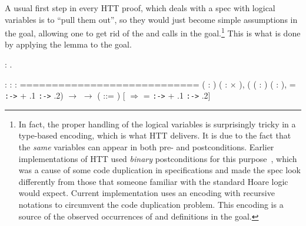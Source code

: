 \coqdocemptyline
A usual first step in every HTT proof, which deals with a spec with
logical variables is to ``pull them out'', so they would just become
simple assumptions in the goal, allowing one to get rid of the
 and  calls in the goal.\footnote{In fact, the
proper handling of the logical variables is surprisingly tricky in a
type-based encoding, which is what HTT delivers. It is due to the fact
that the \emph{same} variables can appear in both pre- and
postconditions. Earlier implementations of HTT used \emph{binary}
postconditions for this
purpose~\cite{Nanevski-al:JFP08,Nanevski-al:POPL10}, which was a cause
of some code duplication in specifications and made the spec look
differently from those that someone familiar with the standard Hoare
logic would expect. Current implementation uses an encoding with
recursive notations to circumvent the code duplication problem. This
encoding is a source of the observed occurrences of  and
 definitions in the goal.} This is what is done by
applying the lemma   to the goal.
\begin{coqdoccode}
\coqdocemptyline
\coqdocnoindent
{}: .\coqdoceol
\coqdocemptyline
\end{coqdoccode}
\coqdoceol
\coqdocemptyline
\coqdocindent{1.00em}
 : \coqdoceol
\coqdocindent{1.00em}
 : \coqdoceol
\coqdocindent{1.00em}
 : \coqdoceol
\coqdocindent{1.00em}
============================\coqdoceol
\coqdocindent{1.50em}
\coqdockw{\ensuremath{\forall}} ( : ) ( :  \ensuremath{\times} ),\coqdoceol
\coqdocindent{1.50em}
( ( : ) ( : ),  =  \texttt{:->}  + .1 \texttt{:->} .2) \ensuremath{\rightarrow}\coqdoceol
\coqdocindent{1.50em}
  \ensuremath{\rightarrow}   ( ::= ) [ \coqdocvar{\_}  \ensuremath{\Rightarrow}  =  \texttt{:->}  + .1 \texttt{:->} .2]

